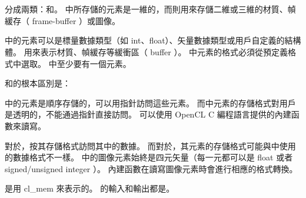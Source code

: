 \startbuffer[sectitlememobj]
\stopbuffer
\section{\getbuffer[sectitlememobj]}
分成兩類：和。
中所存儲的元素是一維的，而則用來存儲二維或三維的材質、幀緩存（ frame-buffer ）或圖像。

中的元素可以是標量數據類型（如 int、float）、矢量數據類型或用戶自定義的結構體。
用來表示材質、幀緩存等緩衝區（ buffer ）。
中元素的格式必須從預定義格式中選取。
中至少要有一個元素。

和的根本區別是：
\startigBase
\item {}中的元素是順序存儲的，可以用指針訪問這些元素。
而中元素的存儲格式對用戶是透明的，不能通過指針直接訪問。
可以使用 OpenCL C 編程語言提供的內建函數來讀寫。

\item 對於，按其存儲格式訪問其中的數據。
而對於，其元素的存儲格式可能與中使用的數據格式不一樣。
中的圖像元素始終是四元矢量（每一元都可以是 float 或者 signed/unsigned integer ）。
內建函數在讀寫圖像元素時會進行相應的格式轉換。
\stopigBase

是用 {\ftEmpha cl\_mem} 來表示的。
的輸入和輸出都是。

